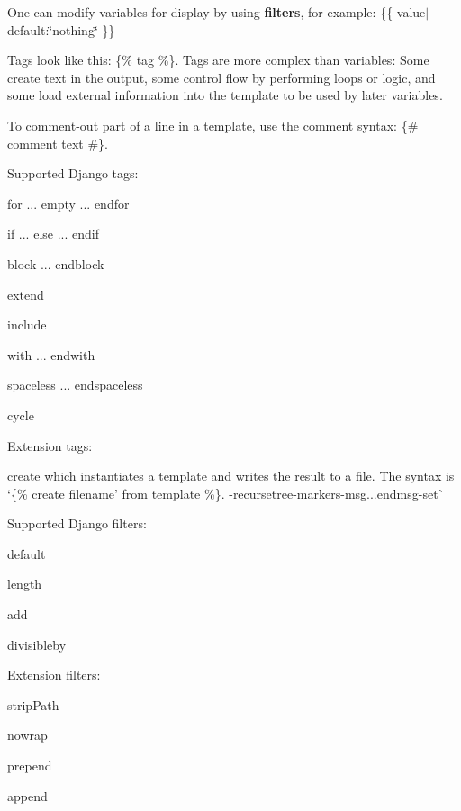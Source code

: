 One can modify variables for display by using {\bfseries{filters}}, for example\+: {\ttfamily \{\{ value$\vert$default\+:\char`\"{}nothing\char`\"{} \}\}}

Tags look like this\+: {\ttfamily \{\% tag \%\}}. Tags are more complex than variables\+: Some create text in the output, some control flow by performing loops or logic, and some load external information into the template to be used by later variables.

To comment-\/out part of a line in a template, use the comment syntax\+: {\ttfamily \{\# comment text \#\}}.

Supported Django tags\+:
\begin{DoxyItemize}
\item {\ttfamily for ... empty ... endfor}
\item {\ttfamily if ... else ... endif}
\item {\ttfamily block ... endblock}
\item {\ttfamily extend}
\item {\ttfamily include}
\item {\ttfamily with ... endwith}
\item {\ttfamily spaceless ... endspaceless}
\item {\ttfamily cycle}
\end{DoxyItemize}

Extension tags\+:
\begin{DoxyItemize}
\item {\ttfamily create} which instantiates a template and writes the result to a file. The syntax is `\{\% create \textquotesingle{}filename' from \textquotesingle{}template\textquotesingle{} \%\}{\ttfamily . -\/}recursetree{\ttfamily  -\/}markers{\ttfamily  -\/}msg{\ttfamily ...}endmsg{\ttfamily  -\/}set\`{}
\end{DoxyItemize}

Supported Django filters\+:
\begin{DoxyItemize}
\item {\ttfamily default}
\item {\ttfamily length}
\item {\ttfamily add}
\item {\ttfamily divisibleby}
\end{DoxyItemize}

Extension filters\+:
\begin{DoxyItemize}
\item {\ttfamily strip\+Path}
\item {\ttfamily nowrap}
\item {\ttfamily prepend}
\item {\ttfamily append} 
\end{DoxyItemize}